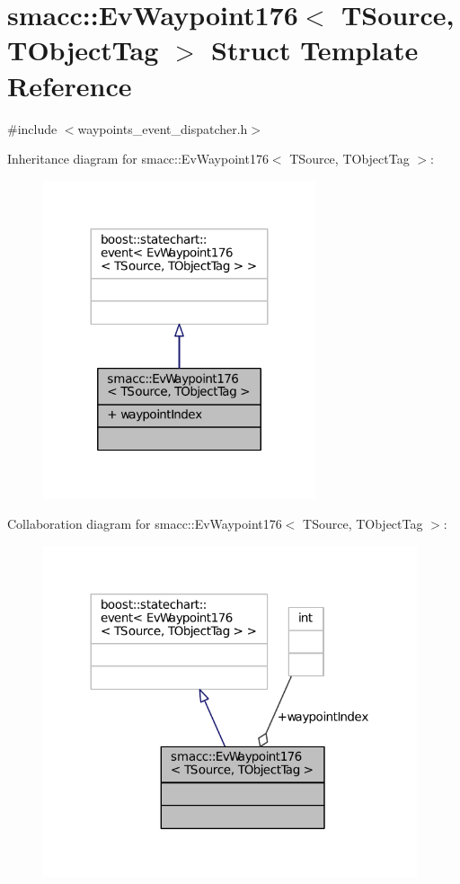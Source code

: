 \hypertarget{structsmacc_1_1EvWaypoint176}{}\section{smacc\+:\+:Ev\+Waypoint176$<$ T\+Source, T\+Object\+Tag $>$ Struct Template Reference}
\label{structsmacc_1_1EvWaypoint176}


{\ttfamily \#include $<$waypoints\+\_\+event\+\_\+dispatcher.\+h$>$}



Inheritance diagram for smacc\+:\+:Ev\+Waypoint176$<$ T\+Source, T\+Object\+Tag $>$\+:
\nopagebreak
\begin{figure}[H]
\begin{center}
\leavevmode
\includegraphics[width=227pt]{structsmacc_1_1EvWaypoint176__inherit__graph}
\end{center}
\end{figure}


Collaboration diagram for smacc\+:\+:Ev\+Waypoint176$<$ T\+Source, T\+Object\+Tag $>$\+:
\nopagebreak
\begin{figure}[H]
\begin{center}
\leavevmode
\includegraphics[width=312pt]{structsmacc_1_1EvWaypoint176__coll__graph}
\end{center}
\end{figure}
